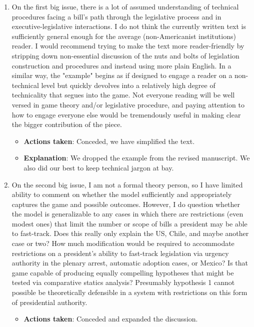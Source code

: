 \documentclass[article,letterpaper,times,12pt,listings-bw,microtype]{article}
\begin{document}
\begin{enumerate}
\item On the first big issue, there is a lot of assumed understanding of technical procedures facing a bill's path through the legislative process and in executive-legislative interactions. I do not think the currently written text is sufficiently general enough for the average (non-Americanist institutions) reader. I would recommend trying to make the text more reader-friendly by stripping down non-essential discussion of the nuts and bolts of legislation construction and procedures and instead using more plain English. In a similar way, the "example" begins as if designed to engage a reader on a non-technical level but quickly devolves into a relatively high degree of technicality that segues into the game. Not everyone reading will be well versed in game theory and/or legislative procedure, and paying attention to how to engage everyone else would be tremendously useful in making clear the bigger contribution of the piece.
\label{sec:orge93bcf9}
\begin{itemize}
\item \textbf{Actions taken}: Conceded, we have simplified the text.
\item \textbf{Explanation}: We dropped the example from the revised manuscript. We also did our best to keep technical jargon at bay.
\end{itemize}
\item On the second big issue, I am not a formal theory person, so I have limited ability to comment on whether the model sufficiently and appropriately captures the game and possible outcomes. However, I do question whether the model is generalizable to any cases in which there are restrictions (even modest ones) that limit the number or scope of bills a president may be able to fast-track. Does this really only explain the US, Chile, and maybe another case or two? How much modification would be required to accommodate restrictions on a president's ability to fast-track legislation via urgency authority in the plenary arrest, automatic adoption cases, or Mexico? Is that game capable of producing equally compelling hypotheses that might be tested via comparative statics analysis? Presumably hypothesis 1 cannot possible be theoretically defensible in a system with restrictions on this form of presidential authority.
\label{sec:org1de3684}
\begin{itemize}
\item \textbf{Actions taken}: Conceded and expanded the discussion.

\end{itemize}
\end{enumerate}
\end{document}
